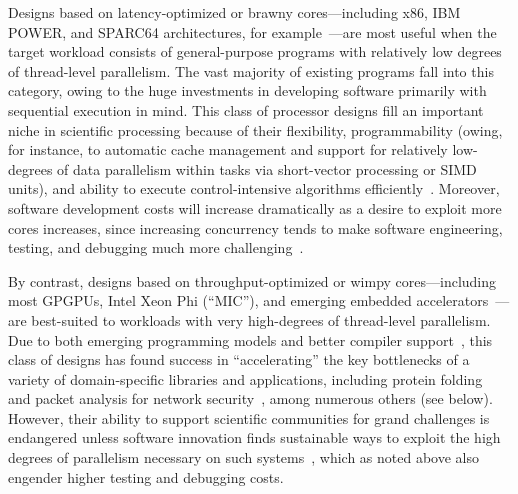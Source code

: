 Designs based on latency-optimized or brawny cores---including x86, IBM POWER, and SPARC64 architectures, for example~\cite{power8,sparcm6,intel-ivytown}---are most useful when the target workload consists of general-purpose programs with relatively low degrees of thread-level parallelism.
The vast majority of existing programs fall into this category, owing to the huge investments in developing software primarily with sequential execution in mind.
This class of processor designs fill an important niche in scientific processing because of their flexibility,
programmability (owing, for instance, to automatic cache management and support for relatively low-degrees of data parallelism within tasks via short-vector processing or SIMD units), and ability to execute control-intensive algorithms efficiently~\cite{Kang2009,Williams2009,aparna.fmm}.
Moreover, software development costs will increase dramatically as a desire to exploit more cores increases, since increasing concurrency tends to make software engineering, testing, and debugging much more challenging~\cite{conf/sc/MattsonRLBHKHVBRD10,Asanovic:2009:VPC:1562764.1562783}.

By contrast, designs based on throughput-optimized or wimpy cores---including most GPGPUs, Intel Xeon Phi (``MIC''), and emerging embedded accelerators~\cite{Bell2008,ATI.Stream,intel.mic,TileGX8100}---are best-suited to workloads with very high-degrees of thread-level parallelism.
Due to both emerging programming models and better compiler support~\cite{NVIDIA2007,OpenCL:www,OpenACC:www}, this class of designs has found success in ``accelerating'' the key bottlenecks of a variety of domain-specific libraries and applications, including protein folding~\cite{5160922} and packet analysis for network security~\cite{fusco:2010:imc}, among numerous others (see below).
However, their ability to support scientific communities for grand challenges is endangered unless
software innovation finds sustainable ways to exploit the high degrees of parallelism necessary on such systems~\cite{patterson:2010:spectrum}, which as noted above also engender higher testing and debugging costs.

